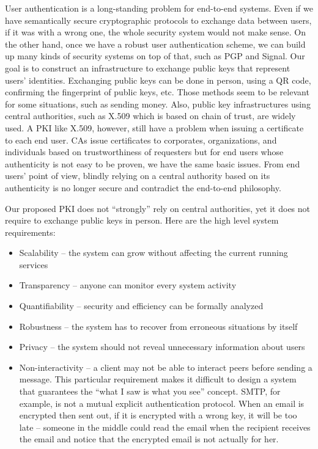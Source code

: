 \documentclass[twoside,twocolumn,10pt,fleqn]{article}
\begin{document}
User authentication is a long-standing problem for end-to-end
systems. Even if we have semantically secure cryptographic protocols
to exchange data between users, if it was with a wrong one, the whole
security system would not make sense. On the other hand, once we have
a robust user authentication scheme, we can build up many kinds of
security systems on top of that, such as PGP and Signal. Our goal is
to construct an infrastructure to exchange public keys that represent
users' identities. Exchanging public keys can be done in person,
using a QR code, confirming the fingerprint of public keys, etc. Those
methods seem to be relevant for some situations, such as sending
money. Also, public key infrastructures using central authorities,
such as X.509 which is based on chain of trust, are widely used. A PKI
like X.509, however, still have a problem when issuing a certificate
to each end user. CAs issue certificates to corporates, organizations,
and individuals based on trustworthiness of requesters but for end
users whose authenticity is not easy to be proven, we have the same
basic issues. From end users' point of view, blindly relying on a
central authority based on its authenticity is no longer secure and
contradict the end-to-end philosophy.

Our proposed PKI does not ``strongly'' rely on central authorities,
yet it does not require to exchange public keys in person. Here are
the high level system requirements:
\begin{itemize}
\item Scalability -- the system can grow without affecting the current running services
\item Transparency -- anyone can monitor every system activity
\item Quantifiability -- security and efficiency can be formally analyzed
\item Robustness -- the system has to recover from erroneous situations by itself
\item Privacy -- the system should not reveal unnecessary information about users
\item Non-interactivity -- a client may not be able to interact peers
before sending a message. This particular requirement makes it
difficult to design a system that guarantees the ``what I saw is what
you see'' concept. SMTP, for example, is not a mutual explicit
authentication protocol. When an email is encrypted then sent out, if
it is encrypted with a wrong key, it will be too late -- someone in
the middle could read the email when the recipient receives the email
and notice that the encrypted email is not actually for her.
\end{itemize}
\end{document}
